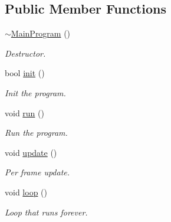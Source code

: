\subsection*{Public Member Functions}
\begin{DoxyCompactItemize}
\item 
\mbox{\label{class_main_program_a499d23be8ebb7f46fef836b4f54849f7}} 
\mbox{\hyperlink{class_main_program_a499d23be8ebb7f46fef836b4f54849f7}{$\sim$\+Main\+Program}} ()
\begin{DoxyCompactList}\small\item\em Destructor. \end{DoxyCompactList}\item 
\mbox{\label{class_main_program_aec58f75c60d2960d04dbb562362785d5}} 
bool \mbox{\hyperlink{class_main_program_aec58f75c60d2960d04dbb562362785d5}{init}} ()
\begin{DoxyCompactList}\small\item\em Init the program. \end{DoxyCompactList}\item 
\mbox{\label{class_main_program_a0180a988aef98a4212237adae354a69c}} 
void \mbox{\hyperlink{class_main_program_a0180a988aef98a4212237adae354a69c}{run}} ()
\begin{DoxyCompactList}\small\item\em Run the program. \end{DoxyCompactList}\item 
\mbox{\label{class_main_program_a1bfcb0eb4d87d60709872e85de2594d1}} 
void \mbox{\hyperlink{class_main_program_a1bfcb0eb4d87d60709872e85de2594d1}{update}} ()
\begin{DoxyCompactList}\small\item\em Per frame update. \end{DoxyCompactList}\item 
\mbox{\label{class_main_program_af13767c3937f5f4189331daba38d022a}} 
void \mbox{\hyperlink{class_main_program_af13767c3937f5f4189331daba38d022a}{loop}} ()
\begin{DoxyCompactList}\small\item\em Loop that runs forever. \end{DoxyCompactList}\item 

\end{DoxyCompactItemize}
